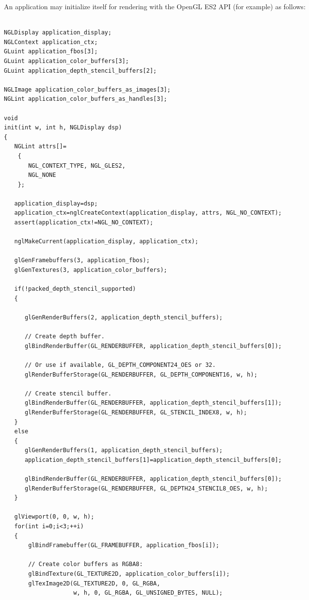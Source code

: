 \documentclass[a4paper,11pt]{article}
\begin{document}
\begin{indenter}{2cm}
\begin{verbatim}
\end{verbatim}

An application may initialize itself for rendering with the OpenGL ES2 API (for example) as follows:

\begin{verbatim}

NGLDisplay application_display;
NGLContext application_ctx;
GLuint application_fbos[3];
GLuint application_color_buffers[3];
GLuint application_depth_stencil_buffers[2];

NGLImage application_color_buffers_as_images[3];
NGLint application_color_buffers_as_handles[3];

void
init(int w, int h, NGLDisplay dsp)
{
   NGLint attrs[]=
    {
       NGL_CONTEXT_TYPE, NGL_GLES2,
       NGL_NONE
    };

   application_display=dsp;
   application_ctx=nglCreateContext(application_display, attrs, NGL_NO_CONTEXT);
   assert(application_ctx!=NGL_NO_CONTEXT);

   nglMakeCurrent(application_display, application_ctx);

   glGenFramebuffers(3, application_fbos);
   glGenTextures(3, application_color_buffers);

   if(!packed_depth_stencil_supported)
   {
      
      glGenRenderBuffers(2, application_depth_stencil_buffers);
   
      // Create depth buffer.
      glBindRenderBuffer(GL_RENDERBUFFER, application_depth_stencil_buffers[0]);
      
      // Or use if available, GL_DEPTH_COMPONENT24_OES or 32.
      glRenderBufferStorage(GL_RENDERBUFFER, GL_DEPTH_COMPONENT16, w, h); 
     
      // Create stencil buffer.
      glBindRenderBuffer(GL_RENDERBUFFER, application_depth_stencil_buffers[1]);
      glRenderBufferStorage(GL_RENDERBUFFER, GL_STENCIL_INDEX8, w, h);   
   }
   else
   {      
      glGenRenderBuffers(1, application_depth_stencil_buffers);
      application_depth_stencil_buffers[1]=application_depth_stencil_buffers[0];

      glBindRenderBuffer(GL_RENDERBUFFER, application_depth_stencil_buffers[0]);
      glRenderBufferStorage(GL_RENDERBUFFER, GL_DEPTH24_STENCIL8_OES, w, h);  
   }

   glViewport(0, 0, w, h);   
   for(int i=0;i<3;++i)
   {
       glBindFramebuffer(GL_FRAMEBUFFER, application_fbos[i]);

       // Create color buffers as RGBA8:
       glBindTexture(GL_TEXTURE2D, application_color_buffers[i]);
       glTexImage2D(GL_TEXTURE2D, 0, GL_RGBA, 
                    w, h, 0, GL_RGBA, GL_UNSIGNED_BYTES, NULL);


\end{verbatim}
\end{indenter}
\end{document}
